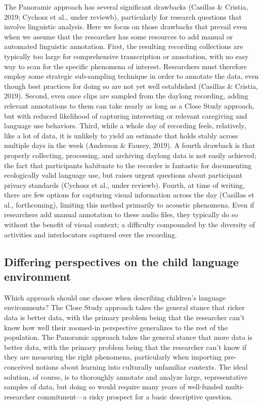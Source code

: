 \documentclass[,man,floatsintext]{apa6}
\begin{document}
The Panoramic approach has several significant drawbacks (Casillas \&
Cristia, 2019; Cychosz et al., under reviewb), particularly for research
questions that involve linguistic analysis. Here we focus on those
drawbacks that prevail even when we assume that the researcher has some
resources to add manual or automated linguistic annotation. First, the
resulting recording collections are typically too large for
comprehensive transcription or annotation, with no easy way to scan for
the specific phenomena of interest. Researchers must therefore employ
some strategic sub-sampling technique in order to annotate the data,
even though best practices for doing so are not yet well established
(Casillas \& Cristia, 2019). Second, even once clips are sampled from
the daylong recording, adding relevant annotations to them can take
nearly as long as a Close Study approach, but with reduced likelihood of
capturing interesting or relevant caregiving and language use behaviors.
Third, while a whole day of recording feels, relatively, like a lot of
data, it is unlikely to yield an estimate that holds stably across
multiple days in the week (Anderson \& Fausey, 2019). A fourth drawback
is that properly collecting, processing, and archiving daylong data is
not easily achieved; the fact that participants habituate to the
recorder is fantastic for documenting ecologically valid language use,
but raises urgent questions about participant privacy standards (Cychosz
et al., under reviewb). Fourth, at time of writing, there are few
options for capturing visual information across the day (Casillas et
al., forthcoming), limiting this method primarily to acoustic phenomena.
Even if researchers add manual annotation to these audio files, they
typically do so without the benefit of visual context; a difficulty
compounded by the diversity of activities and interlocutors captured
over the recording.

\subsection{Differing perspectives on the child language
environment}\label{differing-perspectives-on-the-child-language-environment}

Which approach should one choose when describing children's language
environments? The Close Study approach takes the general stance that
richer data is better data, with the primary problem being that the
researcher can't know how well their zoomed-in perspective generalizes
to the rest of the population. The Panoramic approach takes the general
stance that more data is better data, with the primary problem being
that the researcher can't know if they are measuring the right
phenomena, particularly when importing pre-conceived notions about
learning into culturally unfamiliar contexts. The ideal solution, of
course, is to thoroughly annotate and analyze large, representative
samples of data, but doing so would require many years of well-funded
multi-researcher commitment---a risky prospect for a basic descriptive
question.
\end{document}
